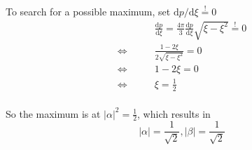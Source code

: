 \documentclass[a4paper,german,12pt,smallheadings]{scrartcl}
\begin{document}
\begin{enumerate}[a)]
    To search for a possible maximum, set $\text{d}p / \text{d} \xi \overset{!}{=} 0$
    \begin{align*}
      &\frac{\text{d}p}{\text{d} \xi} = \frac{4 \pi}{3} \frac{\text{d}p}{\text{d} \xi} \sqrt{\xi - \xi^2} \overset{!}{=} 0 \\
      \Leftrightarrow\qquad
      &\frac{1 - 2 \xi}{2\sqrt{\xi - \xi^2}} = 0 \\
      \Leftrightarrow\qquad
      &1 - 2 \xi = 0 \\
      \Leftrightarrow\qquad
      &\xi = \frac{1}{2} \\
    \end{align*}

    So the maximum is at $|\alpha|^2 = \frac{1}{2}$, which results in
    \begin{equation*}
      |\alpha| = \frac{1}{\sqrt{2}}, |\beta| = \frac{1}{\sqrt{2}}
    \end{equation*}
\end{enumerate}
\end{document}
